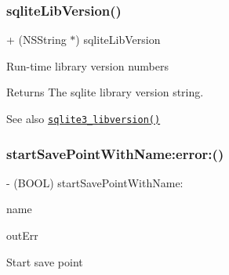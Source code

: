 \subsubsection{\texorpdfstring{sqlite\+Lib\+Version()}{sqliteLibVersion()}}
{\footnotesize\ttfamily + (N\+S\+String $\ast$) sqlite\+Lib\+Version \begin{DoxyParamCaption}{ }\end{DoxyParamCaption}}

Run-\/time library version numbers

\begin{DoxyReturn}{Returns}
The sqlite library version string.
\end{DoxyReturn}
\begin{DoxySeeAlso}{See also}
\href{http://sqlite.org/c3ref/libversion.html}{\tt sqlite3\+\_\+libversion()} 
\end{DoxySeeAlso}
\mbox{\label{interface_o_p_t_l_y_f_m_d_b_database_a394534a47e9f054edfc63021f2a1ebc3}} 
\subsubsection{\texorpdfstring{start\+Save\+Point\+With\+Name\+:error\+:()}{startSavePointWithName:error:()}}
{\footnotesize\ttfamily -\/ (B\+O\+OL) start\+Save\+Point\+With\+Name\+: \begin{DoxyParamCaption}\item[{(N\+S\+String $\ast$)}]{name }\item[{error:(N\+S\+Error $\ast$\+\_\+\+Nullable $\ast$)}]{out\+Err }\end{DoxyParamCaption}}

Start save point


